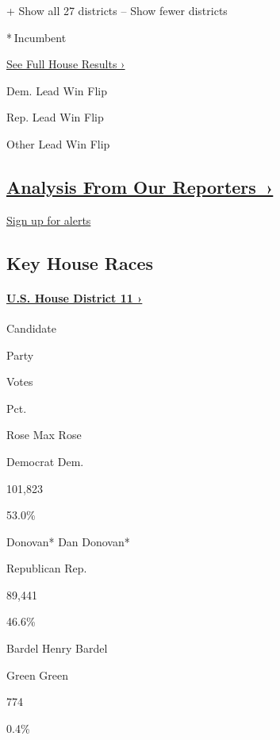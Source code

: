 + Show all 27 districts -- Show fewer districts

* Incumbent~

\href{https://www.nytimes3xbfgragh.onion/interactive/2018/11/06/us/elections/results-house-elections.html}{See
Full House Results ›}

Dem. Lead Win Flip

Rep. Lead Win Flip

Other Lead Win Flip

\hypertarget{analysis-from-our-reporters-}{%
\subsection{\texorpdfstring{\href{https://www.nytimes3xbfgragh.onion/interactive/2018/11/06/us/elections/live-midterm-election-analysis-updates.html}{Analysis
From Our
Reporters~›}}{Analysis From Our Reporters~›}}\label{analysis-from-our-reporters-}}

\protect\hyperlink{}{Sign up for alerts}

\hypertarget{key-house-races}{%
\subsection{Key House Races}\label{key-house-races}}

\hypertarget{us-house-district-11-}{%
\paragraph{\texorpdfstring{\href{https://www.nytimes3xbfgragh.onion/elections/results/new-york-house-district-11}{U.S.
House District 11
›}}{U.S. House District 11 ›}}\label{us-house-district-11-}}

Candidate

Party

Votes

Pct.

 Rose Max Rose

Democrat Dem.

101,823

53.0\%

 Donovan* Dan Donovan*

Republican Rep.

89,441

46.6\%

 Bardel Henry Bardel

Green Green

774

0.4\%

